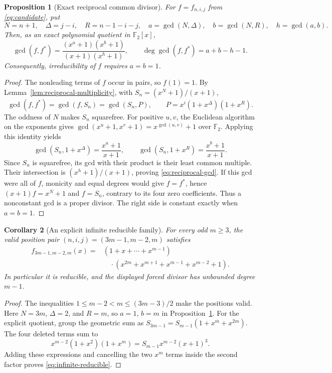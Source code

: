 \documentclass[11pt]{article}
\newtheorem{proposition}{Proposition}[section]
\newtheorem{corollary}[proposition]{Corollary}
\theoremstyle{definition}
\theoremstyle{remark}
\begin{document}
\begin{proposition}[Exact reciprocal common divisor]
\label{prop:reciprocal-gcd}
For \(f=f_{n,i,j}\) from \eqref{eq:candidate}, put
\[
 N=n+1,\quad \Delta=j-i,\quad R=n-1-i-j,\quad
 a=\gcd(N,\Delta),\quad b=\gcd(N,R),\quad h=\gcd(a,b).
\]
Then, as an exact polynomial quotient in \(\mathbb F_2[x]\),
\begin{equation}\label{eq:reciprocal-gcd}
 \gcd(f,f^*)=
 \frac{(x^a+1)(x^b+1)}{(x+1)(x^h+1)},\qquad
 \deg\gcd(f,f^*)=a+b-h-1.
\end{equation}
Consequently, irreducibility of \(f\) requires \(a=b=1\).
\end{proposition}
\begin{proof}
The nonleading terms of \(f\) occur in pairs, so \(f(1)=1\).
By Lemma~\ref{lem:reciprocal-multiplicity}, with
\(S_n=(x^N+1)/(x+1)\),
\[
 \gcd(f,f^*)=\gcd(f,S_n)=\gcd(S_n,P),\qquad
 P=x^i(1+x^\Delta)(1+x^R).
\]
The oddness of \(N\) makes \(S_n\) squarefree. For positive $u,v$,
the Euclidean algorithm on the exponents gives
$\gcd(x^u+1,x^v+1)=x^{\gcd(u,v)}+1$ over $\mathbb F_2$.
Applying this identity yields
\[
 \gcd(S_n,1+x^\Delta)=\frac{x^a+1}{x+1},\qquad
 \gcd(S_n,1+x^R)=\frac{x^b+1}{x+1}.
\]
Since \(S_n\) is squarefree, its gcd with their product is their
least common multiple. Their intersection is
\((x^h+1)/(x+1)\), proving \eqref{eq:reciprocal-gcd}.
If this gcd were all of \(f\), monicity and equal degrees would give
\(f=f^*\), hence \((x+1)f=x^N+1\) and \(f=S_n\), contrary to its
four zero coefficients. Thus a nonconstant gcd is a proper divisor.
The right side is constant exactly when \(a=b=1\).
\end{proof}

\begin{corollary}[An explicit infinite reducible family]
\label{cor:infinite-reducible}
For every odd \(m\ge3\), the valid position pair
\((n,i,j)=(3m-1,m-2,m)\) satisfies
\begin{equation}\label{eq:infinite-reducible}
\begin{split}
 f_{3m-1,m-2,m}(x)
 ={}&(1+x+\cdots+x^{m-1})\\
 &\quad\cdot(x^{2m}+x^{m+1}+x^{m-1}+x^{m-2}+1).
\end{split}
\end{equation}
In particular it is reducible, and the displayed forced divisor
has unbounded degree \(m-1\).
\end{corollary}
\begin{proof}
The inequalities \(1\le m-2<m\le(3m-3)/2\) make the positions valid.
Here \(N=3m\), \(\Delta=2\), and \(R=m\), so
\(a=1\), \(b=m\) in Proposition~\ref{prop:reciprocal-gcd}.
For the explicit quotient, group the geometric sum as
\(S_{3m-1}=S_{m-1}(1+x^m+x^{2m})\). The four deleted terms sum to
\[
 x^{m-2}(1+x^2)(1+x^m)=S_{m-1}x^{m-2}(x+1)^3.
\]
Adding these expressions and cancelling the two \(x^m\) terms
inside the second factor proves \eqref{eq:infinite-reducible}.
\end{proof}
\end{document}
